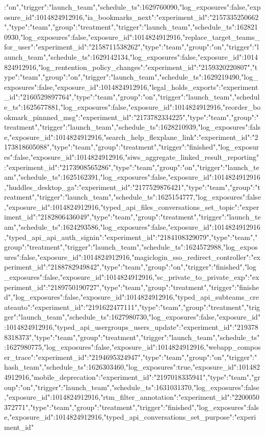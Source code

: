 {:"on","trigger":"launch_team","schedule_ts":1629760090,"log_exposures":false,"exposure_id":1014824912916},"ia_bookmarks_next":{"experiment_id":"2157335250662","type":"team","group":"treatment","trigger":"launch_team","schedule_ts":1628210930,"log_exposures":false,"exposure_id":1014824912916},"replace_target_teams_for_user":{"experiment_id":"2158711538262","type":"team","group":"on","trigger":"launch_team","schedule_ts":1629142134,"log_exposures":false,"exposure_id":1014824912916},"log_rentention_policy_changes":{"experiment_id":"2159320220807","type":"team","group":"on","trigger":"launch_team","schedule_ts":1629219490,"log_exposures":false,"exposure_id":1014824912916},"legal_holds_exports":{"experiment_id":"2160529897764","type":"team","group":"on","trigger":"launch_team","schedule_ts":1625677881,"log_exposures":false,"exposure_id":1014824912916},"reorder_bookmark_pinnned_msg":{"experiment_id":"2173782334225","type":"team","group":"treatment","trigger":"launch_team","schedule_ts":1628210939,"log_exposures":false,"exposure_id":1014824912916},"search_help_flexplane_link":{"experiment_id":"2173818605088","type":"team","group":"treatment","trigger":"finished","log_exposures":false,"exposure_id":1014824912916},"siws_aggregate_linked_result_reporting":{"experiment_id":"2173908565286","type":"team","group":"on","trigger":"launch_team","schedule_ts":1625162391,"log_exposures":false,"exposure_id":1014824912916},"huddles_desktop_ga":{"experiment_id":"2177529876421","type":"team","group":"treatment","trigger":"launch_team","schedule_ts":1625154777,"log_exposures":false,"exposure_id":1014824912916},"typed_api_files_conversations_set_topic":{"experiment_id":"2182806436049","type":"team","group":"treatment","trigger":"launch_team","schedule_ts":1624293586,"log_exposures":false,"exposure_id":1014824912916},"typed_api_api_auth_signin":{"experiment_id":"2184108329079","type":"team","group":"treatment","trigger":"launch_team","schedule_ts":1624572988,"log_exposures":false,"exposure_id":1014824912916},"magiclogin_sso_redirect_controller":{"experiment_id":"2188782949842","type":"team","group":"on","trigger":"finished","log_exposures":false,"exposure_id":1014824912916},"sc_private_to_private_exp":{"experiment_id":"2189750190727","type":"team","group":"treatment","trigger":"finished","log_exposures":false,"exposure_id":1014824912916},"typed_api_subteams_createauto":{"experiment_id":"2191622477111","type":"team","group":"treatment","trigger":"launch_team","schedule_ts":1627980730,"log_exposures":false,"exposure_id":1014824912916},"typed_api_usergroups_users_update":{"experiment_id":"2193788318373","type":"team","group":"treatment","trigger":"launch_team","schedule_ts":1627980775,"log_exposures":false,"exposure_id":1014824912916},"webapp_composer_trace":{"experiment_id":"2194695324947","type":"team","group":"on","trigger":"hash_team","schedule_ts":1626303460,"log_exposures":true,"exposure_id":1014824912916},"mobile_deprecation":{"experiment_id":"2197018335941","type":"team","group":"on","trigger":"launch_team","schedule_ts":1631031370,"log_exposures":false,"exposure_id":1014824912916},"rtm_filter_annotation":{"experiment_id":"2200050372771","type":"team","group":"treatment","trigger":"finished","log_exposures":false,"exposure_id":1014824912916},"typed_api_conversations_set_purpose":{"experiment_id"}
